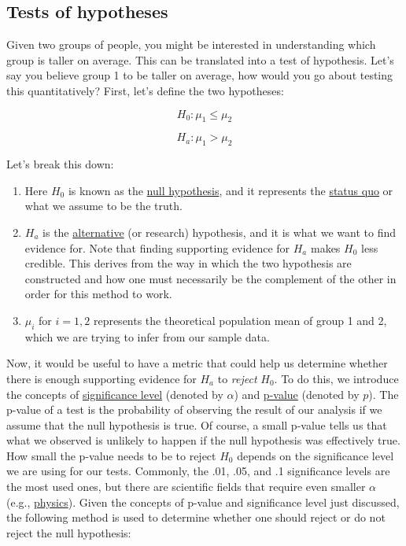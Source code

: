 \documentclass[
  letterpaper,
  DIV=11,
  numbers=noendperiod]{scrartcl}
\providecommand{\tightlist}{%
  \setlength{\itemsep}{0pt}\setlength{\parskip}{0pt}}\usepackage{longtable,booktabs,array}
\begin{document}
\subsection{Tests of hypotheses}\label{sec-testhyp}

Given two groups of people, you might be interested in understanding
which group is taller on average. This can be translated into a test of
hypothesis. Let's say you believe group 1 to be taller on average, how
would you go about testing this quantitatively? First, let's define the
two hypotheses:

\[
H_0: \mu_1 \leq \mu_2
\]

\[
H_a: \mu_1 > \mu_2
\]

Let's break this down:

\begin{enumerate}
\def\labelenumi{\arabic{enumi}.}
\tightlist
\item
  Here \(H_0\) is known as the
  \href{https://en.wikipedia.org/wiki/Null_hypothesis}{null hypothesis},
  and it represents the
  \href{https://www.vocabulary.com/dictionary/status\%20quo}{status quo}
  or what we assume to be the truth.
\item
  \(H_a\) is the
  \href{https://en.wikipedia.org/wiki/Alternative_hypothesis}{alternative}
  (or research) hypothesis, and it is what we want to find evidence for.
  Note that finding supporting evidence for \(H_a\) makes \(H_0\) less
  credible. This derives from the way in which the two hypothesis are
  constructed and how one must necessarily be the complement of the
  other in order for this method to work.
\item
  \(\mu_i\) for \(i = {1,2}\) represents the theoretical population mean
  of group 1 and 2, which we are trying to infer from our sample data.
\end{enumerate}

Now, it would be useful to have a metric that could help us determine
whether there is enough supporting evidence for \(H_a\) to \emph{reject}
\(H_0\). To do this, we introduce the concepts of
\href{https://en.wikipedia.org/wiki/Statistical_significance}{significance
level} (denoted by \(\alpha\)) and
\href{https://www.scribbr.com/statistics/p-value/\#:~:text=A\%20p\%2Dvalue\%2C\%20or\%20probability,to\%20perform\%20your\%20statistical\%20test.}{p-value}
(denoted by \(p\)). The p-value of a test is the probability of
observing the result of our analysis if we assume that the null
hypothesis is true. Of course, a small p-value tells us that what we
observed is unlikely to happen if the null hypothesis was effectively
true. How small the p-value needs to be to reject \(H_0\) depends on the
significance level we are using for our tests. Commonly, the .01, .05,
and .1 significance levels are the most used ones, but there are
scientific fields that require even smaller \(\alpha\) (e.g.,
\href{https://home.cern/resources/faqs/five-sigma}{physics}). Given the
concepts of p-value and significance level just discussed, the following
method is used to determine whether one should reject or do not reject
the null hypothesis:
\end{document}
